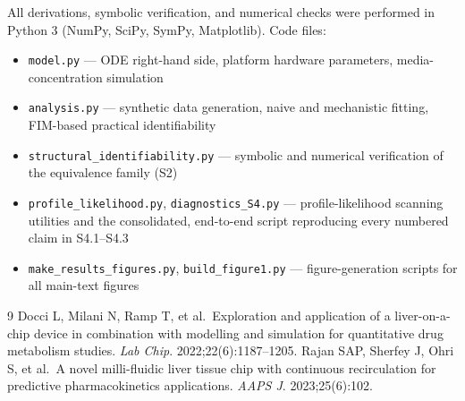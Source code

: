 \documentclass[11pt]{article}
\begin{document}
All derivations, symbolic verification, and numerical checks were performed in Python 3 (NumPy, SciPy, SymPy, Matplotlib). Code files:
\begin{itemize}
\item \texttt{model.py} --- ODE right-hand side, platform hardware parameters, media-concentration simulation
\item \texttt{analysis.py} --- synthetic data generation, naive and mechanistic fitting, FIM-based practical identifiability
\item \texttt{structural\_identifiability.py} --- symbolic and numerical verification of the equivalence family (S2)
\item \texttt{profile\_likelihood.py}, \texttt{diagnostics\_S4.py} --- profile-likelihood scanning utilities and the consolidated, end-to-end script reproducing every numbered claim in S4.1--S4.3
\item \texttt{make\_results\_figures.py}, \texttt{build\_figure1.py} --- figure-generation scripts for all main-text figures
\end{itemize}

\begin{thebibliography}{9}
 Docci L, Milani N, Ramp T, et al.\ Exploration and application of a liver-on-a-chip device in combination with modelling and simulation for quantitative drug metabolism studies. \textit{Lab Chip}. 2022;22(6):1187--1205.
 Rajan SAP, Sherfey J, Ohri S, et al.\ A novel milli-fluidic liver tissue chip with continuous recirculation for predictive pharmacokinetics applications. \textit{AAPS J}. 2023;25(6):102.
\end{thebibliography}
\end{document}
